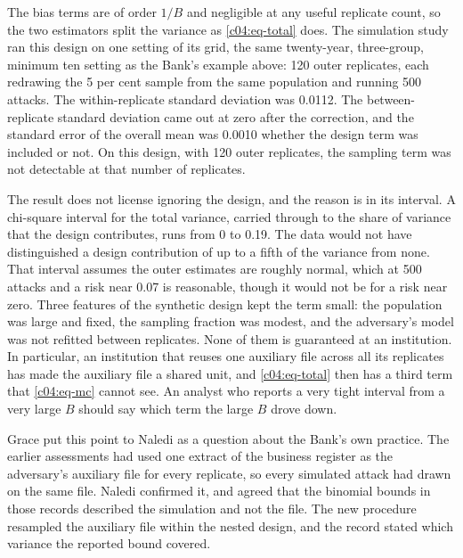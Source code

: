 The bias terms are of order $1/B$ and negligible at any useful replicate count, so the
two estimators split the variance as \eqref{c04:eq-total} does. The simulation study ran
this design on one setting of its grid, the same twenty-year, three-group, minimum ten
setting as the Bank's example above: 120 outer replicates, each redrawing the 5 per cent
sample from the same population and running 500 attacks.
The within-replicate standard deviation was 0.0112. The between-replicate standard
deviation came out at zero after the correction, and the standard error of the overall
mean was 0.0010 whether the design term was included or not.
On this design, with 120 outer replicates, the sampling term was not detectable at that number of replicates.

The result does not license ignoring the design, and the reason is in its interval. A
chi-square interval for the total variance, carried through to the share of variance
that the design contributes, runs from 0 to 0.19.
The data would not have distinguished a design contribution of up to a fifth of the
variance from none. That interval assumes the outer estimates are roughly normal, which at 500 attacks and
a risk near 0.07 is reasonable, though it would not be for a risk near zero.
Three features of the synthetic design kept the term small: the population was large and
fixed, the sampling fraction was modest, and the adversary's model was not refitted
between replicates. None of them is guaranteed at an institution. In particular, an
institution that reuses one auxiliary file across all its replicates has made the
auxiliary file a shared unit, and \eqref{c04:eq-total} then has a third term that
\eqref{c04:eq-mc} cannot see. An analyst who reports a very tight interval from a very large $B$ should say which term
the large $B$ drove down.

Grace put this point to Naledi as a question about the Bank's own practice. The earlier
assessments had used one extract of the business register as the adversary's auxiliary
file for every replicate, so every simulated attack had drawn on the same file. Naledi
confirmed it, and agreed that the binomial bounds in those records described the
simulation and not the file. The new procedure resampled the auxiliary file within the
nested design, and the record stated which variance the reported bound covered.

